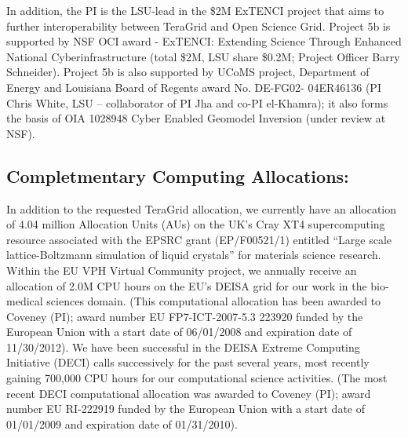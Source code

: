 \documentclass[a4paper,10pt]{article}
\begin{document}
In addition, the PI is the LSU-lead in the \$2M ExTENCI project that aims to further interoperability between TeraGrid and Open Science Grid.  Project 5b is supported by NSF OCI award - ExTENCI: Extending Science Through Enhanced National Cyberinfrastructure (total \$2M, LSU share \$0.2M; Project Officer Barry Schneider).  Project 5b is also supported by UCoMS project, Department of Energy and Louisiana Board of Regents award No. DE-FG02- 04ER46136 (PI Chris White, LSU -- collaborator of PI Jha and co-PI el-Khamra); it also forms the basis of OIA 1028948 Cyber Enabled Geomodel Inversion (under review at NSF).



\subsection{Completmentary Computing Allocations:} In addition to the requested TeraGrid allocation, we currently have an allocation of 4.04 million Allocation Units (AUs) on the UK's Cray XT4 supercomputing resource associated with the EPSRC grant (EP/F00521/1) entitled ``Large scale lattice-Boltzmann simulation of liquid crystals'' for materials science research. Within the EU VPH Virtual Community project, we annually receive an allocation of 2.0M CPU hours on the EU's DEISA grid for our work in the bio-medical sciences domain.  (This computational allocation has been awarded to Coveney (PI); award number EU FP7-ICT-2007-5.3 223920 funded by the European Union with a start date of 06/01/2008 and expiration date of 11/30/2012).  We have been successful in the DEISA Extreme Computing Initiative (DECI) calls successively for the past several years, most recently gaining 700,000 CPU hours for our computational science activities.  (The most recent DECI computational allocation was awarded to Coveney (PI); award number EU RI-222919 funded by the European Union with a start date of 01/01/2009 and expiration date of 01/31/2010).

% 

\end{document}
